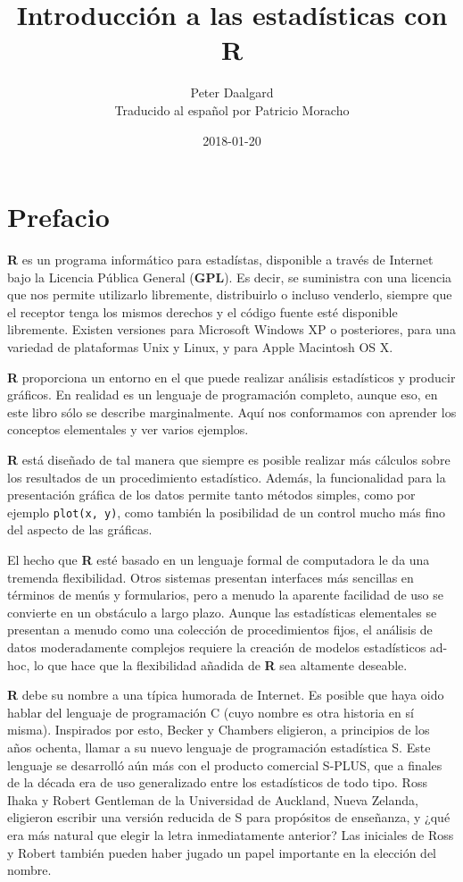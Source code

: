 \documentclass[spanish]{extbook}
\title{Introducción a las estadísticas con R}
\date{2018-01-20}
\author{Peter Daalgard\\\small{Traducido al español por Patricio Moracho}}
\numberwithin{equation}{section}
\numberwithin{figure}{section}
\begin{document}
\maketitle

\chapter*{Prefacio}

\textbf{R} es un programa informático para estadístas, disponible a través de
Internet bajo la Licencia Pública General (\textbf{GPL}). Es decir, se
suministra con una licencia que nos permite utilizarlo libremente, distribuirlo
o incluso venderlo, siempre que el receptor tenga los mismos derechos y el
código fuente esté disponible libremente. Existen versiones para Microsoft
Windows XP o posteriores, para una variedad de plataformas Unix y Linux, y para
Apple Macintosh OS X. 

\textbf{R} proporciona un entorno en el que puede realizar análisis
estadísticos y producir gráficos.  En realidad es un lenguaje de programación
completo, aunque eso, en este libro sólo se describe marginalmente. Aquí nos
conformamos con aprender los conceptos elementales y ver varios ejemplos. 

\textbf{R} está diseñado de tal manera que siempre es posible realizar más
cálculos sobre los resultados de un procedimiento estadístico. Además, la
funcionalidad para la presentación gráfica de los datos permite tanto métodos
simples, como por ejemplo \texttt{plot(x, y)}, como también la posibilidad de
un control mucho más fino del aspecto de las gráficas. 

El hecho que \textbf{R} esté basado en un lenguaje formal de computadora le da
una tremenda flexibilidad.  Otros sistemas presentan interfaces más sencillas
en términos de menús y formularios, pero a menudo la aparente facilidad de uso
se convierte en un obstáculo a largo plazo. Aunque las estadísticas elementales
se presentan a menudo como una colección de procedimientos fijos, el análisis
de datos moderadamente complejos requiere la creación de modelos estadísticos
ad-hoc, lo que hace que la flexibilidad añadida de \textbf{R} sea altamente
deseable.

\textbf{R} debe su nombre a una típica humorada de Internet. Es posible que
haya oido hablar del lenguaje de programación C (cuyo nombre es otra historia
en sí misma). Inspirados por esto, Becker y Chambers eligieron, a principios de
los años ochenta, llamar a su nuevo lenguaje de programación estadística S.
Este lenguaje se desarrolló aún más con el producto comercial S-PLUS, que a
finales de la década era de uso generalizado entre los estadísticos de todo
tipo. Ross Ihaka y Robert Gentleman de la Universidad de Auckland, Nueva
Zelanda, eligieron escribir una versión reducida de S para propósitos de
enseñanza, y ¿qué era más natural que elegir la letra inmediatamente anterior?
Las iniciales de Ross y Robert también pueden haber jugado un papel importante
en la elección del nombre.
\end{document}
